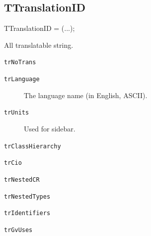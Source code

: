 \documentclass{report}
\newif\ifpdf
\begin{document}
\subsection*{TTranslationID}
\fi
\label{PasDoc_Languages-TTranslationID}
\begin{list}{}{
\setlength{\itemindent}{0cm}
\setlength{\listparindent}{0cm}
\setlength{\leftmargin}{\evensidemargin}
\addtolength{\leftmargin}{\tmplength}
\settowidth{\labelsep}{X}
\addtolength{\leftmargin}{\labelsep}
\setlength{\labelwidth}{\tmplength}
}
\item[\textbf{Declaration}\hfill]
\ifpdf
\begin{flushleft}
\fi
\begin{ttfamily}
TTranslationID = (...);\end{ttfamily}

\ifpdf
\end{flushleft}
\fi

\par
\item[\textbf{Description}]
All translatable string.\item[\textbf{Values}]
\begin{description}
\item[\texttt{trNoTrans}] \label{PasDoc_Languages-trNoTrans}
\index{}
 
\item[\texttt{trLanguage}] \label{PasDoc_Languages-trLanguage}
\index{}
The language name (in English, ASCII).
\item[\texttt{trUnits}] \label{PasDoc_Languages-trUnits}
\index{}
Used for sidebar.
\item[\texttt{trClassHierarchy}] \label{PasDoc_Languages-trClassHierarchy}
\index{}
 
\item[\texttt{trCio}] \label{PasDoc_Languages-trCio}
\index{}
 
\item[\texttt{trNestedCR}] \label{PasDoc_Languages-trNestedCR}
\index{}
 
\item[\texttt{trNestedTypes}] \label{PasDoc_Languages-trNestedTypes}
\index{}
 
\item[\texttt{trIdentifiers}] \label{PasDoc_Languages-trIdentifiers}
\index{}
 
\item[\texttt{trGvUses}] \label{PasDoc_Languages-trGvUses}
\index{}
 

\end{description}
\end{list}
\end{document}
